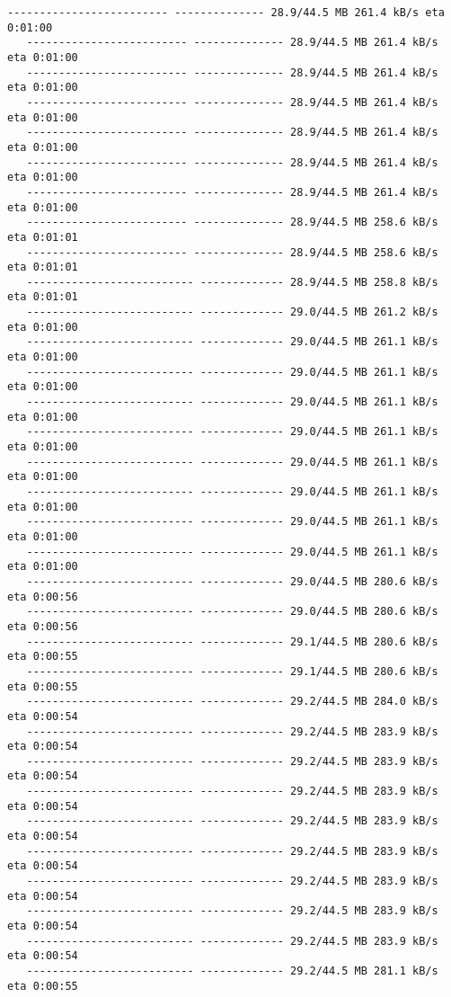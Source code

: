 \documentclass[11pt]{article}
\begin{document}
\begin{Verbatim}[commandchars=\\\{\}]
   ------------------------- -------------- 28.9/44.5 MB 261.4 kB/s eta 0:01:00
   ------------------------- -------------- 28.9/44.5 MB 261.4 kB/s eta 0:01:00
   ------------------------- -------------- 28.9/44.5 MB 261.4 kB/s eta 0:01:00
   ------------------------- -------------- 28.9/44.5 MB 261.4 kB/s eta 0:01:00
   ------------------------- -------------- 28.9/44.5 MB 261.4 kB/s eta 0:01:00
   ------------------------- -------------- 28.9/44.5 MB 261.4 kB/s eta 0:01:00
   ------------------------- -------------- 28.9/44.5 MB 261.4 kB/s eta 0:01:00
   ------------------------- -------------- 28.9/44.5 MB 258.6 kB/s eta 0:01:01
   ------------------------- -------------- 28.9/44.5 MB 258.6 kB/s eta 0:01:01
   -------------------------- ------------- 28.9/44.5 MB 258.8 kB/s eta 0:01:01
   -------------------------- ------------- 29.0/44.5 MB 261.2 kB/s eta 0:01:00
   -------------------------- ------------- 29.0/44.5 MB 261.1 kB/s eta 0:01:00
   -------------------------- ------------- 29.0/44.5 MB 261.1 kB/s eta 0:01:00
   -------------------------- ------------- 29.0/44.5 MB 261.1 kB/s eta 0:01:00
   -------------------------- ------------- 29.0/44.5 MB 261.1 kB/s eta 0:01:00
   -------------------------- ------------- 29.0/44.5 MB 261.1 kB/s eta 0:01:00
   -------------------------- ------------- 29.0/44.5 MB 261.1 kB/s eta 0:01:00
   -------------------------- ------------- 29.0/44.5 MB 261.1 kB/s eta 0:01:00
   -------------------------- ------------- 29.0/44.5 MB 261.1 kB/s eta 0:01:00
   -------------------------- ------------- 29.0/44.5 MB 280.6 kB/s eta 0:00:56
   -------------------------- ------------- 29.0/44.5 MB 280.6 kB/s eta 0:00:56
   -------------------------- ------------- 29.1/44.5 MB 280.6 kB/s eta 0:00:55
   -------------------------- ------------- 29.1/44.5 MB 280.6 kB/s eta 0:00:55
   -------------------------- ------------- 29.2/44.5 MB 284.0 kB/s eta 0:00:54
   -------------------------- ------------- 29.2/44.5 MB 283.9 kB/s eta 0:00:54
   -------------------------- ------------- 29.2/44.5 MB 283.9 kB/s eta 0:00:54
   -------------------------- ------------- 29.2/44.5 MB 283.9 kB/s eta 0:00:54
   -------------------------- ------------- 29.2/44.5 MB 283.9 kB/s eta 0:00:54
   -------------------------- ------------- 29.2/44.5 MB 283.9 kB/s eta 0:00:54
   -------------------------- ------------- 29.2/44.5 MB 283.9 kB/s eta 0:00:54
   -------------------------- ------------- 29.2/44.5 MB 283.9 kB/s eta 0:00:54
   -------------------------- ------------- 29.2/44.5 MB 283.9 kB/s eta 0:00:54
   -------------------------- ------------- 29.2/44.5 MB 281.1 kB/s eta 0:00:55

\end{Verbatim}
\end{document}
